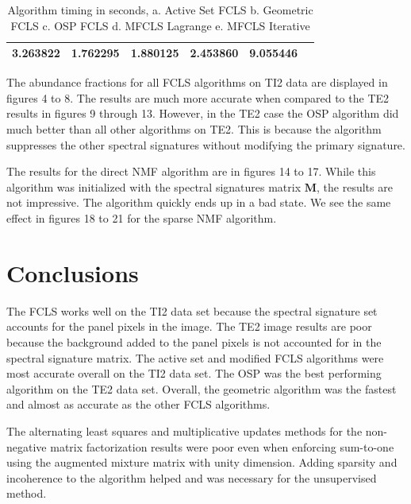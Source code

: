 \documentclass[journal]{IEEEtran}
\begin{document}
\begin{table}[!h]
    \caption{Algorithm timing in seconds, a. Active Set FCLS b. Geometric FCLS c. OSP FCLS d. MFCLS Lagrange e. MFCLS Iterative}
    \centering
    \begin{tabular}{|c|c|c|c|c|c|}
    \hline
    3.263822& 1.762295& 1.880125&  2.453860& 9.055446 \\
    \hline
    \end{tabular}
\end{table}

The abundance fractions for all FCLS algorithms on TI2 data are displayed in figures 4 to 8. The results are much more accurate when compared to the TE2 results in figures 9 through 13. However, in the TE2 case the OSP algorithm did much better than all other algorithms on TE2. This is because the algorithm suppresses the other spectral signatures without modifying the primary signature.

The results for the direct NMF algorithm are in figures 14 to 17. While this algorithm was initialized with the spectral signatures matrix \(\mathbf{M}\), the results are not impressive. The algorithm quickly ends up in a bad state. We see the same effect in figures 18 to 21 for the sparse NMF algorithm.

\section{Conclusions}
The FCLS works well on the TI2 data set because the spectral signature set accounts for the panel pixels in the image. The TE2 image results are poor because the background added to the panel pixels is not accounted for in the spectral signature matrix.  The active set and modified FCLS algorithms were most accurate overall on the TI2 data set. The OSP was the best performing algorithm on the TE2 data set. Overall, the geometric algorithm was the fastest and almost as accurate as the other FCLS algorithms.

The alternating least squares and multiplicative updates methods for the non-negative matrix factorization results were poor even when enforcing sum-to-one using the augmented mixture matrix with unity dimension. Adding sparsity and incoherence to the algorithm helped and was necessary for the unsupervised method.
\end{document}
